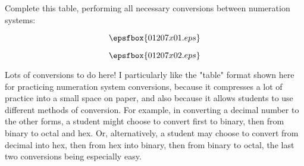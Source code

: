 

Complete this table, performing all necessary conversions between numeration systems:

$$\epsfbox{01207x01.eps}$$







$$\epsfbox{01207x02.eps}$$







Lots of conversions to do here!  I particularly like the "table" format shown here for practicing numeration system conversions, because it compresses a lot of practice into a small space on paper, and also because it allows students to use different methods of conversion.  For example, in converting a decimal number to the other forms, a student might choose to convert first to binary, then from binary to octal and hex.  Or, alternatively, a student may choose to convert from decimal into hex, then from hex into binary, then from binary to octal, the last two conversions being especially easy.




